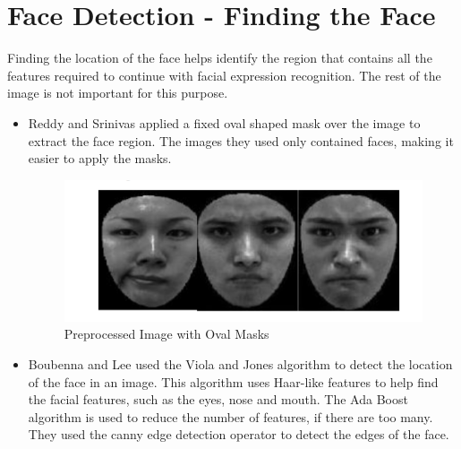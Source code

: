 \section{Face Detection - Finding the Face  }

Finding the location of the face helps identify the region that contains all the features required to continue with facial expression recognition. The rest of the image is not important for this purpose.
\begin{itemize}
\item Reddy and Srinivas applied a fixed oval shaped mask over the image to extract the face region\cite{2}. The images they used only contained faces, making it easier to apply the masks.

\begin{figure}[ht]
  \centering
  \includegraphics[scale=0.4]{6}
  \caption{Preprocessed Image with Oval Masks}
\end{figure}

\item Boubenna and Lee used the Viola and Jones algorithm to detect the location of the face in an image\cite{viola}. This algorithm uses Haar-like features to help find the facial features, such as the eyes, nose and mouth. The Ada Boost algorithm is used to reduce the number of features, if there are too many. They used the canny edge detection operator to detect the edges of the face\cite{3}.
\end{itemize}


